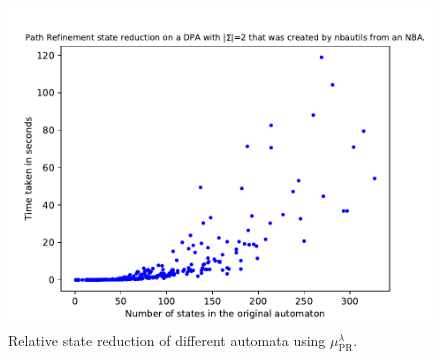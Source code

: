 \begin{figure}
\begin{minipage}{0.49\textwidth}
		\includegraphics[page=3,height=.3\textheight]{../data/analysis/path_refinement/detnbaut_ap1.pdf} 
		\caption{Relative state reduction of different automata using $\mu_\text{PR}^\lambda$.}
		\label{fig:pr:empirical_reduct_rel}
	\end{minipage}
\end{figure}

